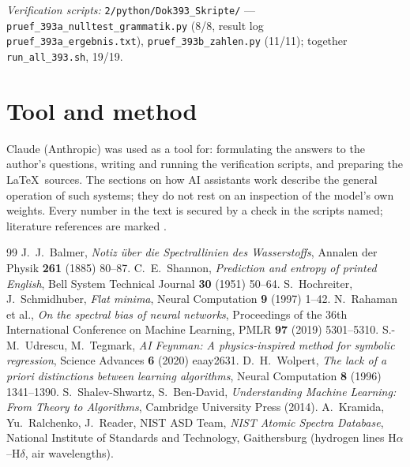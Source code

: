 \vspace{1em}
\noindent\textit{Verification scripts:} \texttt{2/python/Dok393\_Skripte/} ---
\texttt{pruef\_393a\_nulltest\_grammatik.py} (8/8, result log \texttt{pruef\_393a\_ergebnis.txt}),
\texttt{pruef\_393b\_zahlen.py} (11/11); together \texttt{run\_all\_393.sh}, 19/19.

\section*{Tool and method}

Claude (Anthropic) was used as a tool for: formulating the answers to the author's questions, writing
and running the verification scripts, and preparing the \LaTeX\ sources. The sections on how AI
assistants work describe the general operation of such systems; they do not rest on an inspection of
the model's own weights. Every number in the text is secured by a check in the scripts named; literature
references are marked \QM.

\begin{thebibliography}{99}
 J.~J.~Balmer, \textit{Notiz über die Spectrallinien des Wasserstoffs}, Annalen der Physik \textbf{261} (1885) 80--87.
 C.~E.~Shannon, \textit{Prediction and entropy of printed English}, Bell System Technical Journal \textbf{30} (1951) 50--64.
 S.~Hochreiter, J.~Schmidhuber, \textit{Flat minima}, Neural Computation \textbf{9} (1997) 1--42.
 N.~Rahaman et al., \textit{On the spectral bias of neural networks}, Proceedings of the 36th International Conference on Machine Learning, PMLR \textbf{97} (2019) 5301--5310.
 S.-M.~Udrescu, M.~Tegmark, \textit{AI Feynman: A physics-inspired method for symbolic regression}, Science Advances \textbf{6} (2020) eaay2631.
 D.~H.~Wolpert, \textit{The lack of a priori distinctions between learning algorithms}, Neural Computation \textbf{8} (1996) 1341--1390.
 S.~Shalev-Shwartz, S.~Ben-David, \textit{Understanding Machine Learning: From Theory to Algorithms}, Cambridge University Press (2014).
 A.~Kramida, Yu.~Ralchenko, J.~Reader, NIST ASD Team, \textit{NIST Atomic Spectra Database}, National Institute of Standards and Technology, Gaithersburg (hydrogen lines H$\alpha$--H$\delta$, air wavelengths).
\end{thebibliography}

